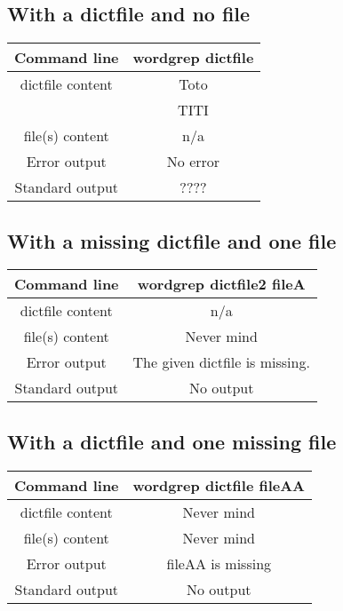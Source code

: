 \documentclass[11pt]{article} %
\begin{document}
\subsection{With a dictfile and no file}
\begin{tabular}{|c|c|}
\hline
Command line &
wordgrep dictfile\\
\hline
dictfile content &
Toto\\
&TITI\\
\hline
file(s) content & n/a\\
\hline
Error output &
No error\\
\hline
Standard output &????\\
\hline
\end{tabular}

\subsection{With a missing dictfile and one file}
\begin{tabular}{|c|c|}
\hline
Command line &
wordgrep dictfile2 fileA\\
\hline
dictfile content &n/a\\
\hline
file(s) content & Never mind\\
\hline
Error output &
The given dictfile is missing.\\
\hline
Standard output &No output\\
\hline
\end{tabular}
\subsection{With a dictfile and one missing file}
\begin{tabular}{|c|c|}
\hline
Command line &
wordgrep dictfile fileAA\\
\hline
dictfile content &Never mind\\
\hline
file(s) content & Never mind\\
\hline
Error output &
fileAA is missing\\
\hline
Standard output &No output\\
\hline
\end{tabular}
\end{document}
